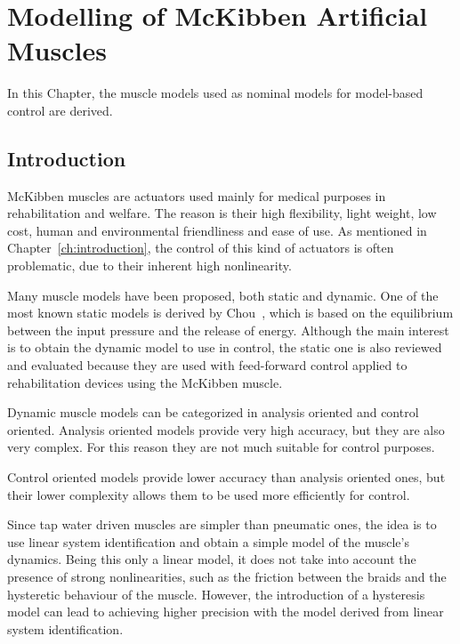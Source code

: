 
\chapter{Modelling of McKibben Artificial Muscles}

In this Chapter, the muscle models used as nominal models for model-based control are derived.

\section{Introduction}

McKibben muscles are actuators used mainly for medical purposes in rehabilitation and welfare. 
The reason is their high flexibility, light weight, low cost, human and environmental friendliness and ease of use.
As mentioned in Chapter~\ref{ch:introduction}, the control of this kind of actuators
is often problematic, due to their inherent high nonlinearity.

Many muscle models have been proposed, both static and dynamic.
One of the most known static models is derived by Chou~\cite{model_chou},
which is based on the equilibrium between the input pressure and the release of energy.
Although the main interest is to obtain the dynamic model to use in control, 
the static one is also reviewed and evaluated because they are used with feed-forward
control applied to rehabilitation devices using the McKibben muscle. 

Dynamic muscle models can be categorized in analysis oriented and control oriented.
Analysis oriented models provide very high accuracy, but they are also very complex.
For this reason they are not much suitable for control purposes.

Control oriented models provide lower accuracy than analysis oriented ones,
but their lower complexity allows them to be used more efficiently for control.


Since tap water driven muscles are simpler than pneumatic ones, the idea is to use
linear system identification and obtain a simple model of the muscle's dynamics.
Being this only a linear model,
it does not take into account the presence of strong nonlinearities,
such as the friction between the braids and the hysteretic behaviour of the muscle.
However, the introduction of a hysteresis model can lead to achieving higher precision
with the model derived from linear system identification.

